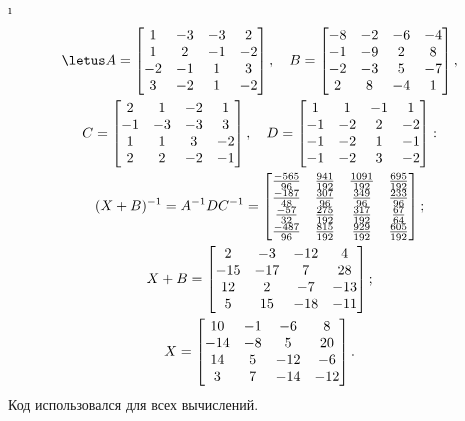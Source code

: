 \i
\begin{gather*}
    \letus A = \begin{bmatrix}
        1 & -3 & -3 & 2\\
        1 & 2 & -1 & -2\\
        -2 & -1 & 1 & 3\\
        3 & -2 & 1 & -2
    \end{bmatrix}, \quad
    B = \begin{bmatrix}
        -8 & -2 & -6 & -4\\
        -1 & -9 & 2 & 8\\
        -2 & -3 & 5 & -7\\
        2 & 8 & -4 & 1
    \end{bmatrix},\\
    C = \begin{bmatrix}
        2 & 1 & -2 & 1\\
        -1 & -3 & -3 & 3\\
        1 & 1 & 3 & -2\\
        2 & 2 & -2 & -1
    \end{bmatrix}, \quad
    D = \begin{bmatrix}
        1 & 1 & -1 & 1\\
        -1 & -2 & 2 & -2\\
        -1 & -2 & 1 & -1\\
        -1 & -2 & 3 & -2
    \end{bmatrix}:\\
    (X+B)^{-1} = A^{-1}DC^{-1} = \begin{bmatrix}
                                    \frac{-565}{96} & \frac{941}{192} & \frac{1091}{192} & \frac{695}{192}\\
                                    \frac{-187}{48} & \frac{307}{96} & \frac{349}{96} & \frac{233}{96}\\
                                    \frac{-57}{32} & \frac{275}{192} & \frac{317}{192} & \frac{67}{64}\\
                                    \frac{-487}{96} & \frac{815}{192} & \frac{929}{192} & \frac{605}{192}
                                 \end{bmatrix};\\
    X+B = \begin{bmatrix}
            2 & -3 & -12 & 4\\
            -15 & -17 & 7 & 28\\
            12 & 2 & -7 & -13\\
            5 & 15 & -18 & -11
          \end{bmatrix};\\
    X = \begin{bmatrix}
            10 & -1 & -6 & 8\\
            -14 & -8 & 5 & 20\\
            14 & 5 & -12 & -6\\
            3 & 7 & -14 & -12
        \end{bmatrix}.
\end{gather*}
Код использовался для всех вычислений.

